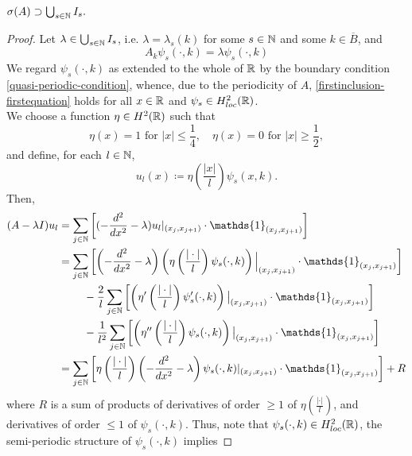 \begin{theorem} \label{4.1:thm-MainResult.FirstInclusion}
	$\sigma(A) \supset \bigcup_{s \in \mathbb{N}} I_{s}.$
	
	\begin{proof}
		Let $\lambda \in \bigcup_{s \in \mathbb{N}} I_{s}$, i.e. $\lambda = \lambda_{s}(k)$ for some $s \in \mathbb{N}$ and some $k \in \overline{B}$, and 
		\begin{equation}
			A_{k} \psi_{s}(\cdot, k) = \lambda \psi_{s}(\cdot, k) \label{firstinclusion-firstequation} %
		\end{equation}
		We regard $\psi_{s}(\cdot, k)$ as extended to the whole of $\mathbb{R}$ by the boundary condition \eqref{quasi-periodic-condition}, whence, due to the periodicity of $A$, \eqref{firstinclusion-firstequation} holds for all $x \in \mathbb{R}$ and $\psi_{s} \in H^{2}_{loc}(\mathbb{R})$. \\ %
		We choose a function $\eta \in H^{2}(\mathbb{R})$ such that
			\[ \eta(x) = 1 \text{ for } |x| \leq \frac{1}{4}, \quad \eta(x) = 0 \text{ for } |x| \geq \frac{1}{2}, \]
		and define, for each $l \in \mathbb{N}$,
			\[ u_{l}(x) \coloneqq \eta\left(\frac{|x|}{l}\right) \psi_{s}(x, k). \]
	 	Then,
		\begin{align}
			(A - \lambda I) u_{l} & = \sum_{j \in \N} \left[ (- \frac{d^{2}}{dx^{2}} - \lambda) u_{l}|_{(x_{j}, x_{j+1})} \cdot \mathds{1}_{(x_{j}, x_{j+1})} \right] \label{eq:sepofspectraleq} \\
				& = \sum_{j \in \N} \left[ \left(- \frac{d^{2}}{dx^{2}} - \lambda \right) \left( \eta\left(\frac{|\cdot|}{l}\right) \psi_{s}(\cdot, k) \right)\Big|_{(x_{j}, x_{j+1})} \cdot \mathds{1}_{(x_{j}, x_{j+1})} \right] \notag \\
				& ~\qquad - \frac{2}{l} \sum_{j \in \N} \left[ \left( \eta'\left(\frac{|\cdot|}{l}\right) \psi_{s}'(\cdot, k) \right)\big|_{(x_{j}, x_{j+1})} \cdot \mathds{1}_{(x_{j}, x_{j+1})}  \right] \notag \\
				& ~\qquad - \frac{1}{l^{2}} \sum_{j \in \N} \left[ \left( \eta''\left(\frac{|\cdot|}{l}\right) \psi_{s}(\cdot, k) \right)\big|_{(x_{j}, x_{j+1})} \cdot \mathds{1}_{(x_{j}, x_{j+1})} \right] \notag \\
				& = \sum_{j \in \N} \left[ \eta\left(\frac{|\cdot|}{l}\right) \left(- \frac{d^{2}}{dx^{2}} - \lambda \right) \psi_{s}(\cdot, k) |_{(x_{j}, x_{j+1})} \cdot \mathds{1}_{(x_{j}, x_{j+1})} \right] + R \notag
		\end{align}
		where $R$ is a sum of products of derivatives of order $\geq 1$ of $\eta\left(\frac{|\cdot|}{l}\right)$, and derivatives of order $\leq 1$ of $\psi_{s}(\cdot, k)$. Thus, note that $\psi_{s}(\cdot, k) \in H^{2}_{loc}(\mathbb{R})$, the semi-periodic structure of $\psi_{s}(\cdot, k)$ implies

\end{proof}
\end{theorem}
